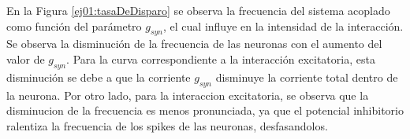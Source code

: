 En la Figura \ref{ej01:tasaDeDisparo} se observa la frecuencia del sistema acoplado como función del parámetro $g_{syn}$, el cual influye en la intensidad de la interacción. Se observa la disminución de la frecuencia de las neuronas con el aumento del valor de $g_{syn}$. Para la curva correspondiente a la interacción excitatoria, esta disminución se debe a que la corriente $g_{syn}$ disminuye la corriente total dentro de la neurona. Por otro lado, para la interaccion excitatoria, se observa que la disminucion de la frecuencia es menos pronunciada, ya que el potencial inhibitorio ralentiza la frecuencia de los spikes de las neuronas, desfasandolos.